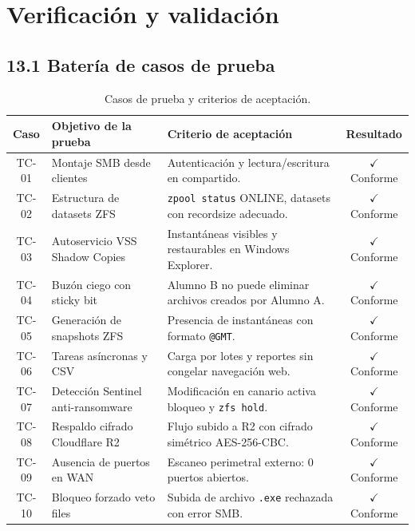 \documentclass[10pt,a4paper]{article}
\begin{document}
\newpage
\section{Verificación y validación}

\subsection{13.1 Batería de casos de prueba}

\begin{table}[htbp]
\centering
\small
\caption{Casos de prueba y criterios de aceptación.}
\label{tab:casos_prueba}
\begin{tabular}{|c|p{4.5cm}|p{6cm}|c|}
\hline
\textbf{\textsf{Caso}} & \textbf{\textsf{Objetivo de la prueba}} & \textbf{\textsf{Criterio de aceptación}} & \textbf{\textsf{Resultado}} \\
\hline
TC-01 & Montaje SMB desde clientes & Autenticación y lectura/escritura en compartido. & $\checkmark$ Conforme \\
\hline
TC-02 & Estructura de datasets ZFS & \texttt{zpool status} ONLINE, datasets con recordsize adecuado. & $\checkmark$ Conforme \\
\hline
TC-03 & Autoservicio VSS Shadow Copies & Instantáneas visibles y restaurables en Windows Explorer. & $\checkmark$ Conforme \\
\hline
TC-04 & Buzón ciego con sticky bit & Alumno B no puede eliminar archivos creados por Alumno A. & $\checkmark$ Conforme \\
\hline
TC-05 & Generación de snapshots ZFS & Presencia de instantáneas con formato \texttt{@GMT}. & $\checkmark$ Conforme \\
\hline
TC-06 & Tareas asíncronas y CSV & Carga por lotes y reportes sin congelar navegación web. & $\checkmark$ Conforme \\
\hline
TC-07 & Detección Sentinel anti-ransomware & Modificación en canario activa bloqueo y \texttt{zfs hold}. & $\checkmark$ Conforme \\
\hline
TC-08 & Respaldo cifrado Cloudflare R2 & Flujo subido a R2 con cifrado simétrico AES-256-CBC. & $\checkmark$ Conforme \\
\hline
TC-09 & Ausencia de puertos en WAN & Escaneo perimetral externo: 0 puertos abiertos. & $\checkmark$ Conforme \\
\hline
TC-10 & Bloqueo forzado veto files & Subida de archivo \texttt{.exe} rechazada con error SMB. & $\checkmark$ Conforme \\
\hline

\end{tabular}
\end{table}
\end{document}
